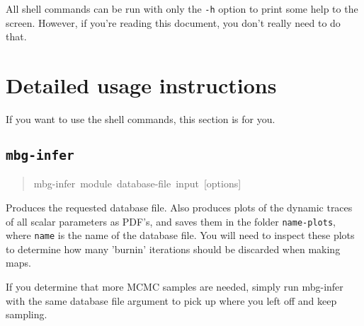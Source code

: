 All shell commands can be run with only the \texttt{-h} option to print some help to the
screen. However, if you're reading this document, you don't really need to do that.





\section{Detailed usage instructions}
\label{sec:detailed-usage-instructions}

If you want to use the shell commands, this section is for you.





\subsection{\texttt{mbg-infer}}
\label{sec:mbg-infer}
\begin{quote}{\ttfamily \raggedright \noindent
mbg-infer~module~database-file~input~{[}options{]}
}\end{quote}

Produces the requested database file. Also produces plots of the dynamic traces of all
scalar parameters as PDF's, and saves them in the folder \texttt{name-plots}, where \texttt{name}
is the name of the database file. You will need to inspect these plots to determine how
many 'burnin' iterations should be discarded when making maps.

If you determine that more MCMC samples are needed, simply run mbg-infer with the same
database file argument to pick up where you left off and keep sampling.





